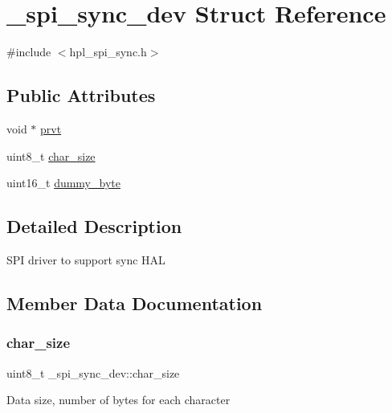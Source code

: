\hypertarget{struct__spi__sync__dev}{}\section{\+\_\+spi\+\_\+sync\+\_\+dev Struct Reference}
\label{struct__spi__sync__dev}


{\ttfamily \#include $<$hpl\+\_\+spi\+\_\+sync.\+h$>$}

\subsection*{Public Attributes}
\begin{DoxyCompactItemize}
\item 
void $\ast$ \hyperlink{struct__spi__sync__dev_acff7c75825e3cfabf015372ad55dc035}{prvt}
\item 
uint8\+\_\+t \hyperlink{struct__spi__sync__dev_a250fbc50cb729774c961337989447a1f}{char\+\_\+size}
\item 
uint16\+\_\+t \hyperlink{struct__spi__sync__dev_a30b4694ec5d5a5810d3cca9ed6878a4b}{dummy\+\_\+byte}
\end{DoxyCompactItemize}


\subsection{Detailed Description}
S\+PI driver to support sync H\+AL 

\subsection{Member Data Documentation}
\mbox{\label{struct__spi__sync__dev_a250fbc50cb729774c961337989447a1f}} 
\subsubsection{\texorpdfstring{char\+\_\+size}{char\_size}}
{\footnotesize\ttfamily uint8\+\_\+t \+\_\+spi\+\_\+sync\+\_\+dev\+::char\+\_\+size}

Data size, number of bytes for each character \mbox{\label{struct__spi__sync__dev_a30b4694ec5d5a5810d3cca9ed6878a4b}} 
